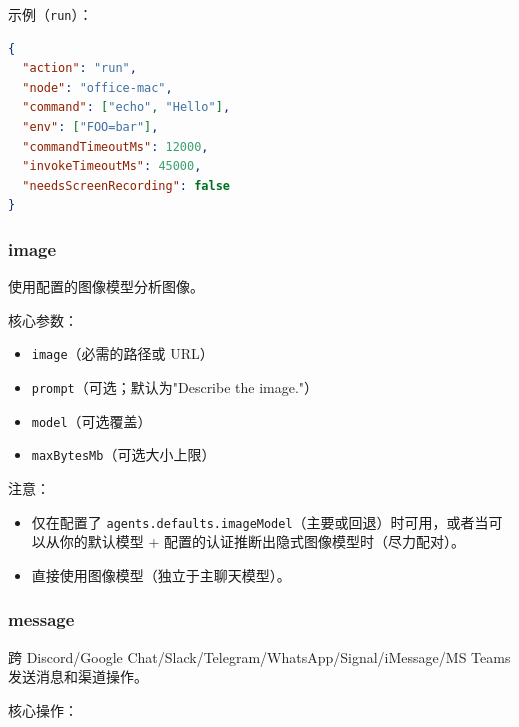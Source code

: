 示例（\texttt{run}）：

\begin{lstlisting}[language=json]
{
  "action": "run",
  "node": "office-mac",
  "command": ["echo", "Hello"],
  "env": ["FOO=bar"],
  "commandTimeoutMs": 12000,
  "invokeTimeoutMs": 45000,
  "needsScreenRecording": false
}
\end{lstlisting}


\subsubsection{image}


使用配置的图像模型分析图像。

核心参数：

\begin{itemize}
  \item \texttt{image}（必需的路径或 URL）
  \item \texttt{prompt}（可选；默认为"Describe the image."）
  \item \texttt{model}（可选覆盖）
  \item \texttt{maxBytesMb}（可选大小上限）
\end{itemize}


注意：

\begin{itemize}
  \item 仅在配置了 \texttt{agents.defaults.imageModel}（主要或回退）时可用，或者当可以从你的默认模型 + 配置的认证推断出隐式图像模型时（尽力配对）。
  \item 直接使用图像模型（独立于主聊天模型）。
\end{itemize}


\subsubsection{message}


跨 Discord/Google Chat/Slack/Telegram/WhatsApp/Signal/iMessage/MS Teams 发送消息和渠道操作。

核心操作：

